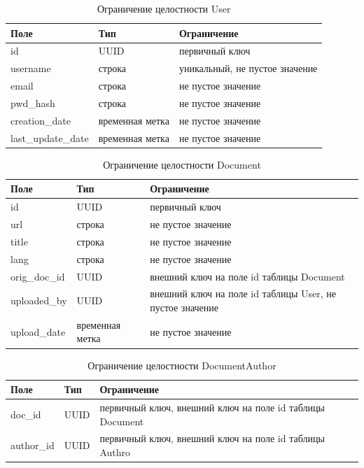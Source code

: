\begin{table}[H]
\centering
\caption{Ограничение целостности User}
\begin{tabular}{|m{4cm}|m{3cm}|m{6cm}|}
\hline
\textbf{Поле} & \textbf{Тип} & \textbf{Ограничение} \\ \hline
id & UUID & первичный ключ \\ \hline
username & строка & уникальный, не пустое значение \\ \hline
email & строка & не пустое значение \\ \hline
pwd\_hash & строка & не пустое значение \\ \hline
creation\_date & временная метка & не пустое значение \\ \hline
last\_update\_date & временная метка & не пустое значение \\ \hline
\end{tabular}
\end{table}

\begin{table}[H]
\centering
\caption{Ограничение целостности Document}
\begin{tabular}{|m{3cm}|m{3cm}|m{6cm}|}
\hline
\textbf{Поле} & \textbf{Тип} & \textbf{Ограничение} \\ \hline
id & UUID & первичный ключ \\ \hline
url & строка & не пустое значение \\ \hline
title & строка & не пустое значение \\ \hline
lang & строка & не пустое значение \\ \hline
orig\_doc\_id & UUID & внешний ключ на поле id таблицы Document \\ \hline
uploaded\_by & UUID & внешний ключ на поле id таблицы User, не пустое значение \\ \hline
upload\_date & временная метка & не пустое значение \\ \hline
\end{tabular}
\end{table}

\begin{table}[H]
\centering
\caption{Ограничение целостности DocumentAuthor}
\begin{tabular}{|m{3cm}|m{3cm}|m{6cm}|}
\hline
\textbf{Поле} & \textbf{Тип} & \textbf{Ограничение} \\ \hline
doc\_id & UUID & первичный ключ, внешний ключ на поле id таблицы Document \\ \hline
author\_id & UUID & первичный ключ, внешний ключ на поле id таблицы Authro \\ \hline
\end{tabular}
\end{table}

